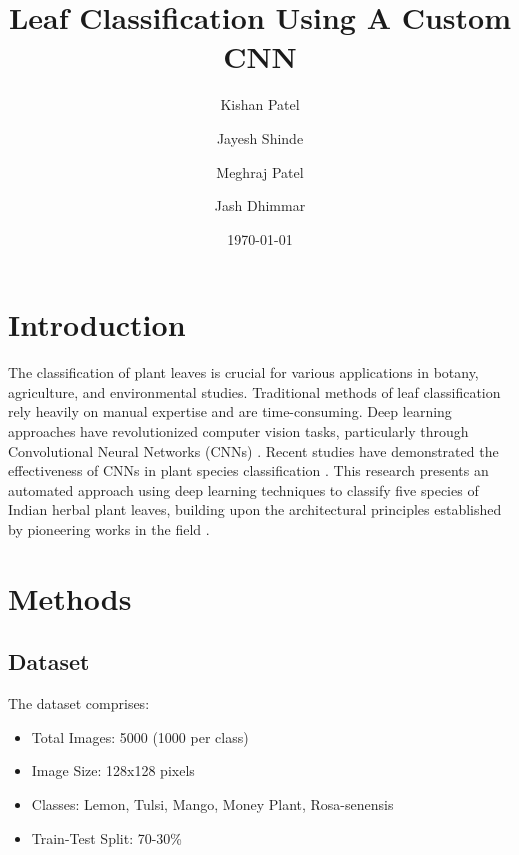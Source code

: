 \documentclass[twocolumn]{article}
\title{\Large Leaf Classification Using A Custom CNN}
\author[1\thanks{\tt{kishan.patel@amcst.edu.in}}]{Kishan Patel}
\author[1]{Jayesh Shinde}
\author[1]{Meghraj Patel}
\author[1]{Jash Dhimmar}
\affil[1]{Asha M Tarsadia Institute of Computer Science and Technology}
\date{\today}
\begin{document}

\linenumbers

\section{Introduction}
The classification of plant leaves is crucial for various applications in botany, agriculture, and environmental studies. Traditional methods of leaf classification rely heavily on manual expertise and are time-consuming. Deep learning approaches \cite{lecun2015deep} have revolutionized computer vision tasks, particularly through Convolutional Neural Networks (CNNs) \cite{krizhevsky2012imagenet}. Recent studies have demonstrated the effectiveness of CNNs in plant species classification \cite{wu2019plant, pawara2017comparing}. This research presents an automated approach using deep learning techniques to classify five species of Indian herbal plant leaves, building upon the architectural principles established by pioneering works in the field \cite{simonyan2014very}.

\section{Methods}
\subsection{Dataset}
The dataset comprises:
\begin{itemize}\itemsep4pt
    \item Total Images: 5000 (1000 per class)
    \item Image Size: 128x128 pixels
    \item Classes: Lemon, Tulsi, Mango, Money Plant, Rosa-senensis
    \item Train-Test Split: 70-30\%
\end{itemize}
\end{document}
